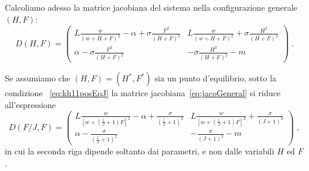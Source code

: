 Calcoliamo adesso la matrice jacobiana del sistema nella configurazione generale $(H, F)$:
\begin{equation}
    D(H, F) =
    \begin{pmatrix}
        L \frac{w}{{(w + H + F)}^2} - \alpha + \sigma \frac{F^2}{{(H+F)}^2} &
        L \frac{w}{{(w + H + F)}^2} + \sigma \frac{H^2}{{(H+F)}^2}
        \\
        \alpha - \sigma \frac{F^2}{{(H+F)}^2} &
        - \sigma \frac{H^2}{{(H+F)}^2} - m
    \end{pmatrix} \; .
    \label{eq:jacoGeneral}
\end{equation}

Se assumiamo che $(H, F) = (H^*, F^*)$ sia un punto d'equilibrio, sotto la condizione ~\eqref{eq:kh11posEqJ}
la matrice jacobiana~\eqref{eq:jacoGeneral} si riduce all'espressione
\begin{equation}
    D \left( F/J, F \right) =
    \begin{pmatrix}
        L \frac{w}{ {\left[ w + \left( \frac{1}{J} +1 \right) F \right]}^2 } - \alpha
        + \frac{ \sigma }{ {\left( \frac{1}{J} + 1 \right)}^2 } &
        L \frac{w}{ {\left[ w + \left( \frac{1}{J} +1 \right) F \right]}^2 }
        + \frac{ \sigma }{ {\left( J + 1 \right)}^2 } \\
        \alpha - \frac{ \sigma }{ {\left( \frac{1}{J} + 1 \right)}^2 } &
        - \frac{ \sigma }{ {\left( J + 1 \right)}^2 } - m
    \end{pmatrix} \; ,
    \label{eq:jacoOnJFH}
\end{equation}
in cui la seconda riga dipende soltanto dai parametri, e non dalle variabili $H$ ed $F$.


